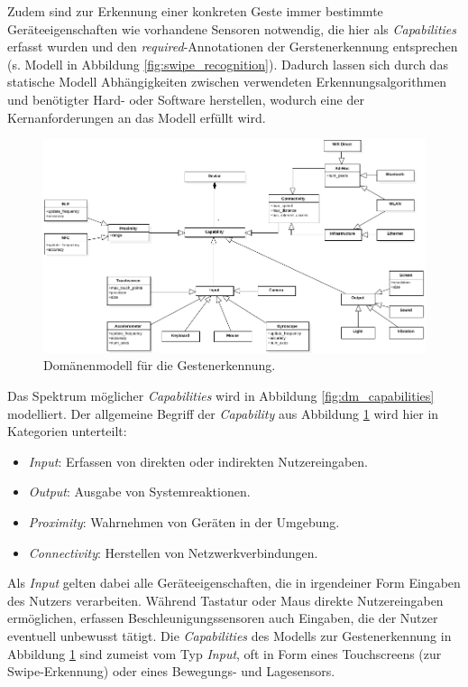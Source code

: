Zudem sind zur Erkennung einer konkreten Geste immer bestimmte Geräteeigenschaften wie vorhandene Sensoren notwendig, die hier als \textit{Capabilities} erfasst wurden und den \textit{required}-Annotationen der Gerstenerkennung entsprechen (s. Modell in Abbildung \ref{fig:swipe_recognition}). Dadurch lassen sich durch das statische Modell Abhängigkeiten zwischen verwendeten Erkennungsalgorithmen und benötigter Hard- oder Software herstellen, wodurch eine der Kernanforderungen an das Modell erfüllt wird.
\begin{figure}
\centering
\includegraphics[page=2,width=\textwidth,height=0.58\textheight]{bilder/domain_model.pdf}
\caption{Domänenmodell für die Gestenerkennung.}
\label{fig:dm_gestures}
\end{figure}

Das Spektrum möglicher \textit{Capabilities} wird in Abbildung \ref{fig:dm_capabilities} modelliert. Der allgemeine Begriff der \textit{Capability} aus Abbildung \ref{fig:dm_gestures} wird hier in Kategorien unterteilt:
\begin{itemize}
\item \textit{Input}: Erfassen von direkten oder indirekten Nutzereingaben.
\item \textit{Output}: Ausgabe von Systemreaktionen.
\item \textit{Proximity}: Wahrnehmen von Geräten in der Umgebung.
\item \textit{Connectivity}: Herstellen von Netzwerkverbindungen.
\end{itemize}

Als \textit{Input} gelten dabei alle Geräteeigenschaften, die in irgendeiner Form Eingaben des Nutzers verarbeiten. Während Tastatur oder Maus direkte Nutzereingaben ermöglichen, erfassen \zb Beschleunigungssensoren auch Eingaben, die der Nutzer eventuell unbewusst tätigt. Die \textit{Capabilities} des Modells zur Gestenerkennung in Abbildung \ref{fig:dm_gestures} sind zumeist vom Typ \textit{Input}, oft in Form eines Touchscreens (\zb zur Swipe-Erkennung) oder eines Bewegungs- und Lagesensors.

